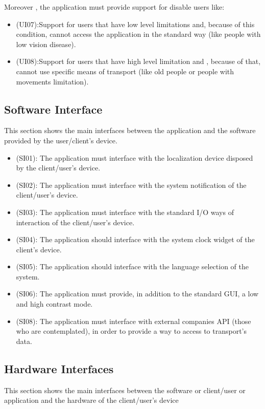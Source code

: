 \documentclass[a4paper,leqno]{book}
\begin{document}
Moreover , the application must provide support for disable users like:
\begin{itemize}

\item (UI07):Support for users that have low level limitations and, because of this condition, cannot access the application in the standard way (like people with low vision disease). 
\item (UI08):Support for users that have high level limitation and , because of that, cannot use specific means of transport (like old people or people with movements limitation).

\end{itemize}

\subsection{Software Interface}
This section shows the main interfaces between the application and the software provided by the user/client's device.

\begin{itemize}
\item (SI01): The application must interface with the localization device disposed by the client/user's device.
\item (SI02): The application must interface with the system notification of the client/user's device.
\item (SI03): The application must interface with the standard I/O ways of interaction of the client/user's device.
\item (SI04): The application should interface with the system clock widget of the client's device.
\item (SI05): The application should interface with the language selection of the system.
\item (SI06): The application must provide, in addition to the standard GUI, a low and high contrast mode. 
\item (SI08): The application must interface with external companies API (those who are contemplated), in order to provide a way to access to transport's data.
\end{itemize}

\subsection{Hardware Interfaces}
This section shows the main interfaces between the software or client/user or application and the hardware of the client/user's device
\end{document}
